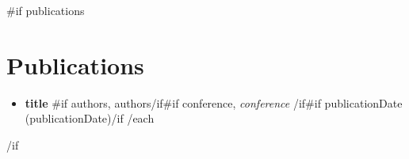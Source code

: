 \documentclass[11pt,a4paper]{article}
\newcommand{\resumeItem}[1]{\item\small{#1}}
\begin{document}
{{#if publications}}
\section{Publications}
\begin{itemize}[leftmargin=12pt]
{{#each publications}}
  \resumeItem{\textbf{ {{title}} }{{#if authors}}, {{authors}}{{/if}}{{#if conference}}, \textit{ {{conference}} }{{/if}}{{#if publicationDate}} ({{publicationDate}}){{/if}} }
{{/each}}
\end{itemize}
{{/if}}
\end{document}
